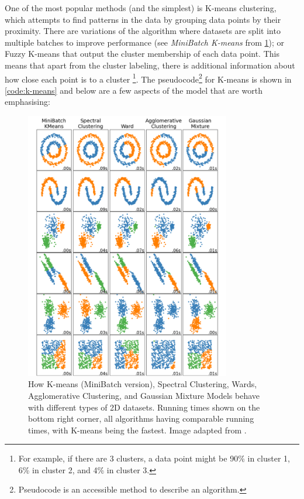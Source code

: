 One of the most popular methods (and the simplest) is K-means clustering, which attempts to find patterns in the data by grouping data points by their proximity. There are variations of the algorithm where datasets are split into multiple batches to improve performance (see \textit{MiniBatch K-means} from \cref{fig:lit:clustering_types}); or Fuzzy K-means \citep{Bezdek1984-ao} that output the cluster membership of each data point. This means that apart from the cluster labeling, there is additional information about how close each point is to a cluster \footnote{For example, if there are 3 clusters, a data point might be 90\% in cluster 1, 6\% in cluster 2, and 4\% in cluster 3.}. The pseudocode\footnote{Pseudocode is an accessible method to describe an algorithm.} for K-means is shown in \cref{code:k-means} and below are a few aspects of the model that are worth emphasising:
\begin{figure}[!t]
  \centering
  \includegraphics[width=0.8\textwidth,height=0.5\textheight,keepaspectratio]{Sections/Lit_review/Resources/clustering_scikit.png}
    \caption[Clustering models on different datasets]{How K-means (MiniBatch version), Spectral Clustering, Wards, Agglomerative Clustering, and Gaussian Mixture Models behave with different types of 2D datasets. Running times shown on the bottom right corner, all algorithms having comparable running times, with K-means being the fastest. Image adapted from \citet{Scikit-learn_undated-ax}.}
    \label{fig:lit:clustering_types}
\end{figure}

